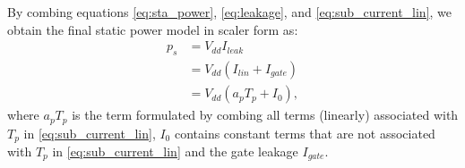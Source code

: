 By combing equations \eqref{eq:sta_power}, \eqref{eq:leakage}, and \eqref{eq:sub_current_lin}, we obtain the final static power model in scaler form as:
\begin{equation}\label{eq:sta_power_lin}
\begin{split}
p_s&=V_{dd}I_{leak}\\
&=V_{dd} (I_{lin}+I_{gate})\\
&=V_{dd}(a_p T_p + I_0),
\end{split}
\end{equation}
where $a_pT_p$ is the term formulated by combing all terms (linearly) associated with $T_p$ in \eqref{eq:sub_current_lin},
$I_{0}$ contains constant terms that are not associated with $T_p$ in \eqref{eq:sub_current_lin} and the gate leakage $I_{gate}$.




